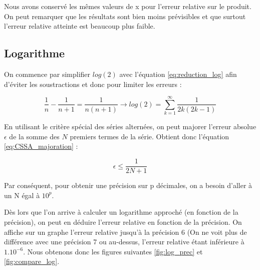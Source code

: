 \documentclass{article}
\begin{document}
Nous avons conservé les mêmes valeurs de x pour l'erreur relative sur le produit. On peut remarquer que les résultats sont bien moins prévisibles et que surtout l'erreur relative atteinte est beaucoup plus faible. 

\subsection*{Logarithme}

On commence par simplifier $log(2)$ avec l'équation \ref{eq:reduction_log} afin d'éviter les soustractions et donc pour limiter les erreurs : 

\begin{equation}
\frac{1}{n}-\frac{1}{n+1}=\frac{1}{n(n+1)} \rightarrow log(2) = \sum_{k=1}^{\infty}\frac{1}{2k(2k-1)}
\label{eq:reduction_log}
\end{equation}

En utilisant le critère spécial des séries alternées, on peut majorer l'erreur absolue $\epsilon$ de la somme des $N$ premiers termes de la série. Obtient donc l'équation \ref{eq:CSSA_majoration} :

\begin{equation}
    \epsilon \leq \frac{1}{2N+1}
    \label{eq:CSSA_majoration}
\end{equation}

Par conséquent, pour obtenir une précision sur p décimales, on a besoin d'aller à un N égal à ${10^{p}}$. 

Dès lors que l'on arrive à calculer un logarithme approché (en fonction de la précision), on peut en déduire l'erreur relative en fonction de la précision. On affiche sur un graphe l'erreur relative jusqu'à la précision 6 (On ne voit plus de différence avec une précision 7 ou au-dessus, l'erreur relative étant inférieure à ${1.10^{-6}}$. Nous obtenons donc les figures suivantes \ref{fig:log_prec} et \ref{fig:compare_log}.
\end{document}
